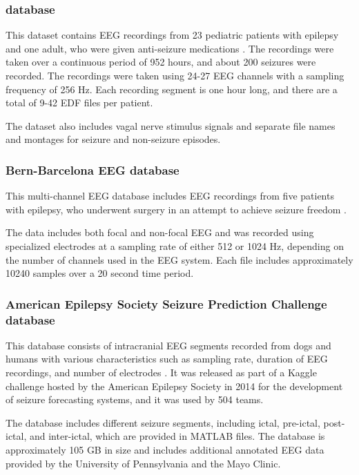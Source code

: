 \subsubsection{ database}
This dataset contains \gls{EEG} recordings from 23 pediatric patients with epilepsy and one adult, who were given anti-seizure medications \cite{shoeb_application_2009, shoeb_chb-mit_2010}. The recordings were taken over a continuous period of 952 hours, and about 200 seizures were recorded. The recordings were taken using 24-27 \gls{EEG} channels with a sampling frequency of 256 Hz. Each recording segment is one hour long, and there are a total of 9-42 \gls{EDF} files per patient. 

The dataset also includes vagal nerve stimulus signals and separate file names and montages for seizure and non-seizure episodes.

\subsubsection{Bern-Barcelona EEG database}
This multi-channel \gls{EEG} database includes \gls{EEG} recordings from five patients with epilepsy, who underwent surgery in an attempt to achieve seizure freedom \cite{andrzejak_nonrandomness_2012}. 

The data includes both focal and non-focal \gls{EEG} and was recorded using specialized electrodes at a sampling rate of either 512 or 1024 Hz, depending on the number of channels used in the \gls{EEG} system. Each file includes approximately 10240 samples over a 20 second time period.

\subsubsection{American Epilepsy Society Seizure Prediction Challenge database}
This database consists of intracranial \gls{EEG} segments recorded from dogs and humans with various characteristics such as sampling rate, duration of \gls{EEG} recordings, and number of electrodes \cite{howbert_forecasting_2014}. It was released as part of a Kaggle challenge hosted by the American Epilepsy Society in 2014 for the development of seizure forecasting systems, and it was used by 504 teams. 

The database includes different seizure segments, including ictal, pre-ictal, post-ictal, and inter-ictal, which are provided in MATLAB files. The database is approximately 105 GB in size and includes additional annotated \gls{EEG} data provided by the University of Pennsylvania and the Mayo Clinic.

